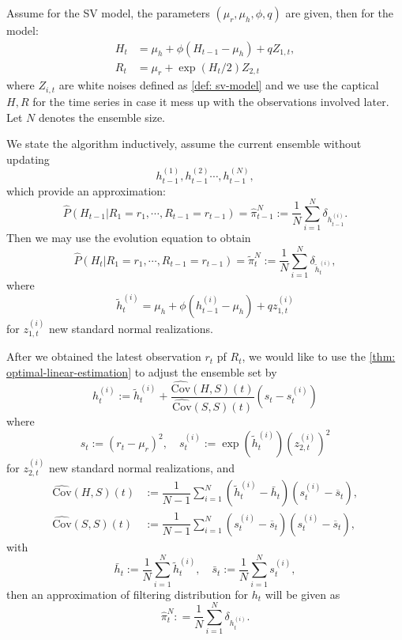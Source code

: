 \begin{definition}
    Assume for the SV model, the parameters $(\mu_r,\mu_h,\phi,q)$ are given, then for the model:
    \[
    \begin{aligned}
        H_t &= \mu_h + \phi(H_{t-1}-\mu_h) + qZ_{1,t}, \\
        R_t &= \mu_r + \exp\left({H_t/2}\right)Z_{2,t}
    \end{aligned}
    \]
    where $Z_{i,t}$ are white noises defined as \ref{def: sv-model} and we use the captical $H,R$ for the time series in case it mess up with the observations involved later. Let $N$ denotes the ensemble size.\par
    We state the algorithm inductively, assume the current ensemble without updating \[h_{t-1}^{(1)},h_{t-1}^{(2)}\cdots,h_{t-1}^{(N)},\]
    which provide an approximation:
    \[
    \widehat{P}(H_{t-1}|R_1=r_1,\cdots,R_{t-1}=r_{t-1}) = \widehat{\pi}_{t-1}^N:= \dfrac{1}{N}\sum\limits_{i=1}^N \delta_{h_{t-1}^{(i)}}.
    \]
    Then we may use the evolution equation to obtain
    \[
    \widehat{P}(H_t|R_1 = r_1,\cdots,R_{t-1}=r_{t-1}) = \widetilde{\pi}_{t}^N:=\dfrac{1}{N}\sum\limits_{i=1}^N\delta_{\tilde{h}_t^{(i)}},
    \]
    where \[\tilde{h}_t^{(i)} = \mu_h + \phi(h_{t-1}^{(i)}-\mu_h)+qz_{1,t}^{(i)}\]
    for $z_{1,t}^{(i)}$ new standard normal realizations.\par
    After we obtained the latest observation $r_t$ pf $R_t$, we would like to use the \ref{thm: optimal-linear-estimation} to adjust the ensemble set by
    \[
    h_t^{(i)} := \tilde{h}_t^{(i)}+\dfrac{\widehat{\text{Cov}}(H,S)(t)}{\widehat{\text{Cov}}(S,S)(t)}(s_t-s_t^{(i)})
    \]
    where
    \[
    s_t:= (r_t-\mu_r)^2,\quad s_t^{(i)} :=\exp(\tilde{h}_t^{(i)})(z_{2,t}^{(i)})^2
    \]
    for $z_{2,t}^{(i)}$ new standard normal realizations, and
    \[
    \begin{aligned}
        \widehat{\text{Cov}}(H,S)(t)&:= \dfrac{1}{N-1}\sum\limits_{i=1}^N(\tilde{h}_t^{(i)}-\bar{h}_t)(s_t^{(i)}-\overline{s}_t),\\
        \widehat{\text{Cov}}(S,S)(t)&:= \dfrac{1}{N-1}\sum\limits_{i=1}^N(s_t^{(i)}-\overline{s}_t)(s_t^{(i)}-\overline{s}_t),
    \end{aligned}
    \]
    with
    \[\bar{h}_t:= \dfrac{1}{N}\sum\limits_{i=1}^N \tilde{h}_t^{(i)}, \quad
        \bar{s}_t:= \dfrac{1}{N}\sum\limits_{i=1}^N {s}_t^{(i)},\]
    then an approximation of filtering distribution for $h_t$ will be given as
    \[
    \widehat{\pi}_t^N: = \dfrac{1}{N}\sum\limits_{i=1}^N \delta_{h_t^{(i)}}.
    \]
\end{definition}


